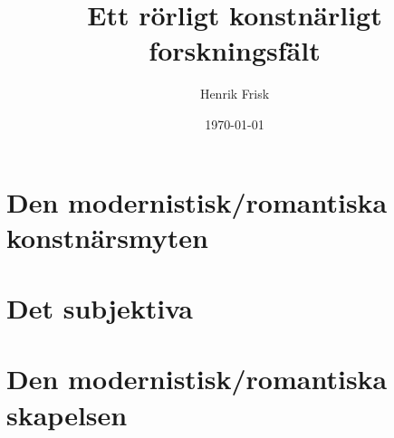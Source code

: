 \documentclass{beamer}
\begin{document}
\title{Ett rörligt konstnärligt forskningsfält} 
\author{Henrik Frisk} 
\date{\today} 

\frame{\titlepage} 



\section{Den modernistisk/romantiska konstnärsmyten}


 \section{Det subjektiva}
\frame{}

\section{Den modernistisk/romantiska skapelsen}
\frame{}
\end{document}
